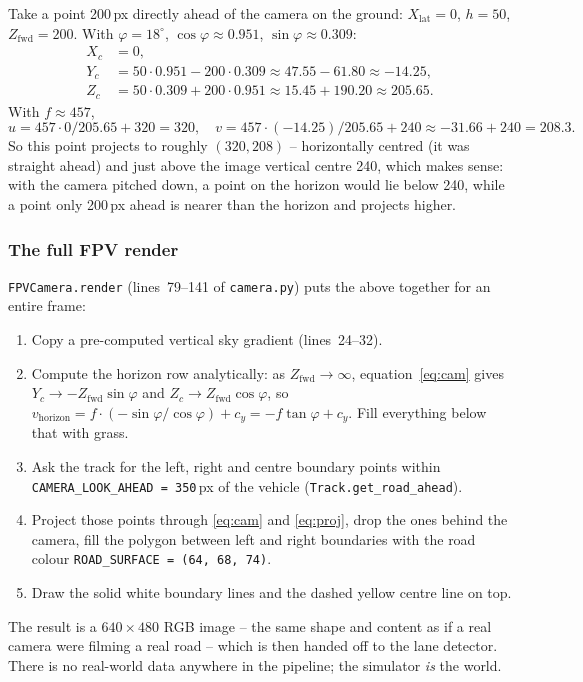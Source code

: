 \begin{example}
Take a point 200\,px directly ahead of the camera on the ground:
$X_{\text{lat}}=0$, $h=50$, $Z_{\text{fwd}}=200$. With
$\varphi=18^\circ$, $\cos\varphi\approx 0.951$,
$\sin\varphi\approx 0.309$:
\begin{align*}
X_c &= 0,\\
Y_c &= 50\cdot 0.951 - 200\cdot 0.309\approx 47.55 - 61.80 \approx -14.25,\\
Z_c &= 50\cdot 0.309 + 200\cdot 0.951 \approx 15.45 + 190.20 \approx 205.65.
\end{align*}
With $f\approx 457$,
\[
u = 457\cdot 0/205.65 + 320 = 320,\quad
v = 457\cdot(-14.25)/205.65 + 240 \approx -31.66+240 = 208.3.
\]
So this point projects to roughly $(320,208)$ -- horizontally centred
(it was straight ahead) and just above the image vertical centre 240,
which makes sense: with the camera pitched down, a point on the
horizon would lie below 240, while a point only 200\,px ahead is
nearer than the horizon and projects higher.
\end{example}

\subsubsection{The full FPV render}

\texttt{FPVCamera.render} (lines~79--141 of \texttt{camera.py}) puts
the above together for an entire frame:
\begin{enumerate}[leftmargin=1.8em,itemsep=2pt]
  \item Copy a pre-computed vertical sky gradient (lines~24--32).
  \item Compute the horizon row analytically: as $Z_{\text{fwd}}\to\infty$,
        equation~\eqref{eq:cam} gives $Y_c\to-Z_{\text{fwd}}\sin\varphi$
        and $Z_c\to Z_{\text{fwd}}\cos\varphi$, so
        $v_{\text{horizon}} = f\cdot(-\sin\varphi/\cos\varphi)+c_y
        = -f\tan\varphi + c_y$. Fill everything below that with grass.
  \item Ask the track for the left, right and centre boundary points
        within \texttt{CAMERA\_LOOK\_AHEAD~=~350}\,px of the vehicle
        (\texttt{Track.get\_road\_ahead}).
  \item Project those points through \eqref{eq:cam} and \eqref{eq:proj},
        drop the ones behind the camera, fill the polygon between left
        and right boundaries with the road colour
        \texttt{ROAD\_SURFACE = (64, 68, 74)}.
  \item Draw the solid white boundary lines and the dashed yellow
        centre line on top.
\end{enumerate}
The result is a $640\times 480$ RGB image -- the same shape and
content as if a real camera were filming a real road -- which is then
handed off to the lane detector. There is no real-world data anywhere
in the pipeline; the simulator \emph{is} the world.

